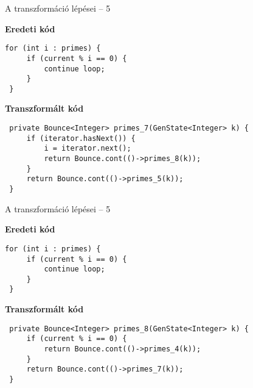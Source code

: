 \begin{frame}[fragile]{A transzformáció lépései -- 5}
\begin{center}\textbf{Eredeti kód}\end{center}
\begin{lstlisting}[linebackgroundcolor={
            \btLstHL<1>{1}
        }]
 for (int i : primes) {
     if (current % i == 0) {
         continue loop;
     }
 }
\end{lstlisting}

\begin{center}\textbf{Transzformált kód}\end{center}
\begin{lstlisting}
 private Bounce<Integer> primes_7(GenState<Integer> k) {
     if (iterator.hasNext()) {
         i = iterator.next();
         return Bounce.cont(()->primes_8(k));
     }
     return Bounce.cont(()->primes_5(k));
 }
\end{lstlisting}
\addtocounter{framenumber}{-1}
\end{frame}


\begin{frame}[fragile]{A transzformáció lépései -- 5}
\begin{center}\textbf{Eredeti kód}\end{center}
\begin{lstlisting}[linebackgroundcolor={
            \btLstHL<1>{2-4}
        }]
 for (int i : primes) {
     if (current % i == 0) {
         continue loop;
     }
 }
\end{lstlisting}

\begin{center}\textbf{Transzformált kód}\end{center}
\begin{lstlisting}
 private Bounce<Integer> primes_8(GenState<Integer> k) {
     if (current % i == 0) {
         return Bounce.cont(()->primes_4(k));
     }
     return Bounce.cont(()->primes_7(k));
 }
\end{lstlisting}
\addtocounter{framenumber}{-1}
\end{frame}        



